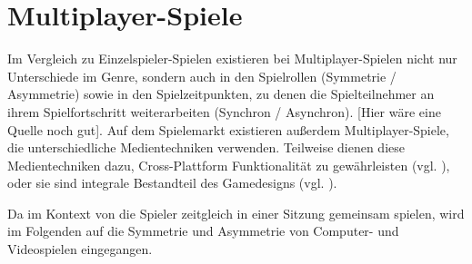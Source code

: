 

\section{Multiplayer-Spiele}
Im Vergleich zu Einzelspieler-Spielen existieren bei Multiplayer-Spielen nicht nur Unterschiede im Genre, sondern auch in den Spielrollen (Symmetrie / Asymmetrie) sowie in den Spielzeitpunkten, zu denen die Spielteilnehmer an ihrem Spielfortschritt weiterarbeiten (Synchron / Asynchron). [Hier wäre eine Quelle noch gut]. Auf dem Spielemarkt existieren außerdem Multiplayer-Spiele, die unterschiedliche Medientechniken verwenden. Teilweise dienen diese Medientechniken dazu, Cross-Plattform Funktionalität zu gewährleisten (vgl. \cite{noauthor_baldurs_nodate}), oder sie sind integrale Bestandteil des Gamedesigns (vgl. \cite{noauthor_keep_nodate}).

Da im Kontext von  die Spieler zeitgleich in einer Sitzung gemeinsam spielen, wird im Folgenden auf die Symmetrie und Asymmetrie von Computer- und Videospielen eingegangen.




